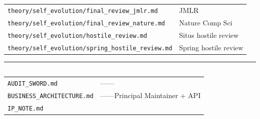 \documentclass[
  12pt,
]{article}
\begin{document}
\subsection{}\label{ux5ba1ux67e5ux8bb0ux5f55}

\begin{longtable}[]{@{}
  >{\raggedright\arraybackslash}p{}
  >{\raggedright\arraybackslash}p{}@{}}
\toprule\noalign{}
\begin{minipage}[b]{\linewidth}\raggedright

\end{minipage} & \begin{minipage}[b]{\linewidth}\raggedright

\end{minipage} \\
\midrule\noalign{}
\endhead
\bottomrule\noalign{}
\endlastfoot
\texttt{theory/self\_evolution/final\_review\_jmlr.md} & JMLR
 \\
\texttt{theory/self\_evolution/final\_review\_nature.md} & Nature Comp
Sci  \\
\texttt{theory/self\_evolution/hostile\_review.md} & Situs hostile
review \\
\texttt{theory/self\_evolution/spring\_hostile\_review.md} & Spring
hostile review \\
\end{longtable}

\begin{center}\rule{0.5\linewidth}{0.5pt}\end{center}

\subsection{}\label{ux5173ux952eux58f0ux660e}

\begin{longtable}[]{@{}
  >{\raggedright\arraybackslash}p{}
  >{\raggedright\arraybackslash}p{}@{}}
\toprule\noalign{}
\begin{minipage}[b]{\linewidth}\raggedright

\end{minipage} & \begin{minipage}[b]{\linewidth}\raggedright

\end{minipage} \\
\midrule\noalign{}
\endhead
\bottomrule\noalign{}
\endlastfoot
\texttt{AUDIT\_SWORD.md} & ------ \\
\texttt{BUSINESS\_ARCHITECTURE.md} & ------Principal Maintainer
+ API  \\
\texttt{IP\_NOTE.md} &  \\
\end{longtable}
\end{document}
